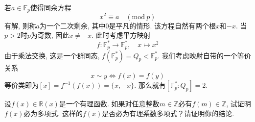 \begin{remark}
    若$a \in \mathbb{F}_p$使得同余方程
    \[
        x^2 \equiv a \quad (\mathrm{mod}~p)
    \]
    有解, 则称$a$为一个二次剩余, 其中$0$是平凡的情形. 该方程自然有两个根$x$和$-x$. 当$p > 2$时$p$为奇数, 因此$x \neq -x$. 此时考虑平方映射
    \[
        f: \mathbb{F}_p^* \to \mathbb{F}_p^*,\quad x \mapsto x^2
    \]
    由于乘法交换, 这是一个群同态, $f(\mathbb{F}_p^*) = Q_p < \mathbb{F}_p^*$. 我们考虑映射自带的一个等价关系
    \[
        x \sim y \iff f(x) = f(y)
    \]
    等价类即为$[x] = f^{-1}(f(x)) = \{x, -x\}$. 那么就有$[\mathbb{F}_p^*:Q_p] = 2$.
\end{remark}

\begin{problem}
    设$f(x) \in \mathbb{R}(x)$是一个有理函数. 如果对任意整数$m \in \mathbb{Z}$必有$f(m) \in \mathbb{Z}$, 试证明$f(x)$必为多项式. 这样的$f(x)$是否必为有理系数多项式？请证明你的结论.
\end{problem}

